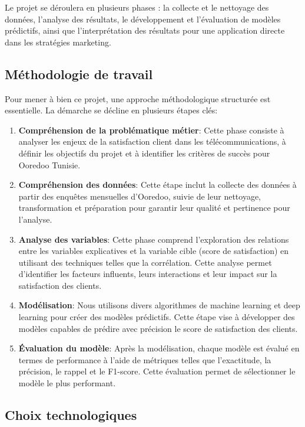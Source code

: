 Le projet se déroulera en plusieurs phases : la collecte et le nettoyage des données, l’analyse des résultats, le développement et l’évaluation de modèles prédictifs, ainsi que l'interprétation des résultats pour une application directe dans les stratégies marketing.
\subsection{Méthodologie de travail}

Pour mener à bien ce projet, une approche méthodologique structurée est essentielle. La démarche se décline en plusieurs étapes clés:

\begin{enumerate}
    \item \textbf{Compréhension de la problématique métier}: Cette phase consiste à analyser les enjeux de la satisfaction client dans les télécommunications, à définir les objectifs du projet et à identifier les critères de succès pour Ooredoo Tunisie.
    
    \item \textbf{Compréhension des données}: Cette étape inclut la collecte des données à partir des enquêtes mensuelles d'Ooredoo, suivie de leur nettoyage, transformation et préparation pour garantir leur qualité et pertinence pour l'analyse.
    
    \item \textbf{Analyse des variables}: Cette phase comprend l'exploration des relations entre les variables explicatives et la variable cible (score de satisfaction) en utilisant des techniques telles que la corrélation. Cette analyse permet d'identifier les facteurs influents, leurs interactions et leur impact sur la satisfaction des clients.
    
    \item \textbf{Modélisation}: Nous utilisons divers algorithmes de machine learning et deep learning pour créer des modèles prédictifs. Cette étape vise à développer des modèles capables de prédire avec précision le score de satisfaction des clients.
    
    \item \textbf{Évaluation du modèle}: Après la modélisation, chaque modèle est évalué en termes de performance à l'aide de métriques telles que l'exactitude, la précision, le rappel et le F1-score. Cette évaluation permet de sélectionner le modèle le plus performant.
\end{enumerate}

\subsection{Choix technologiques}

